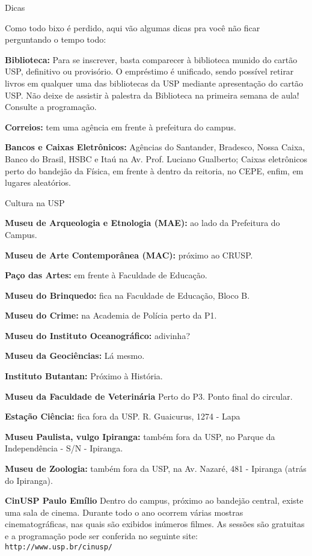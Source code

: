 \begin{secao}{Dicas}

Como todo bixo é perdido, aqui vão algumas dicas pra você não ficar perguntando o tempo todo:

{\bf Biblioteca:} Para se inscrever, basta comparecer à biblioteca munido do
cartão USP, definitivo ou provisório. O empréstimo é unificado, sendo possível
retirar livros em qualquer uma das bibliotecas da USP mediante apresentação do
cartão USP. Não deixe de assistir à palestra da Biblioteca na primeira semana
de aula! Consulte a programação.

{\bf Correios:} tem uma agência em frente à prefeitura do campus.

{\bf Bancos e Caixas Eletrônicos:} Agências do Santander, Bradesco,
Nossa Caixa, Banco do Brasil, HSBC e Itaú na Av. Prof. Luciano
Gualberto; Caixas eletrônicos perto do bandejão da Física, em frente à dentro da reitoria, no CEPE, enfim, em lugares aleatórios.

\begin{subsecao}{Cultura na USP}

{\bf Museu de Arqueologia e Etnologia (MAE):} ao lado da Prefeitura do Campus.

{\bf Museu de Arte Contemporânea (MAC):} próximo ao CRUSP.

{\bf Paço das Artes:} em frente à Faculdade de Educação.

{\bf Museu do Brinquedo:} fica na Faculdade de Educação, Bloco B.

{\bf Museu do Crime:} na Academia de Polícia perto da P1.

{\bf Museu do Instituto Oceanográfico:} adivinha?

{\bf Museu da Geociências:} Lá mesmo.

{\bf Instituto Butantan:} Próximo à História.

{\bf Museu da Faculdade de Veterinária} Perto do P3. Ponto final do circular.

{\bf Estação Ciência:} fica fora da USP. R. Guaicurus, 1274 - Lapa

{\bf Museu Paulista, vulgo Ipiranga: }também fora da USP, no Parque da
Independência - S/N  - Ipiranga.

{\bf Museu de Zoologia: }também fora da USP, na Av. Nazaré, 481  -
Ipiranga (atrás do Ipiranga).

{\bf CinUSP Paulo Emílio} Dentro do campus, próximo ao bandejão central, existe uma sala de cinema. Durante todo o ano ocorrem várias mostras cinematográficas, nas quais são exibidos inúmeros filmes. As sessões são gratuitas e a programação pode ser conferida no seguinte site: {\tt http://www.usp.br/cinusp/}



\end{subsecao}
\end{secao}

